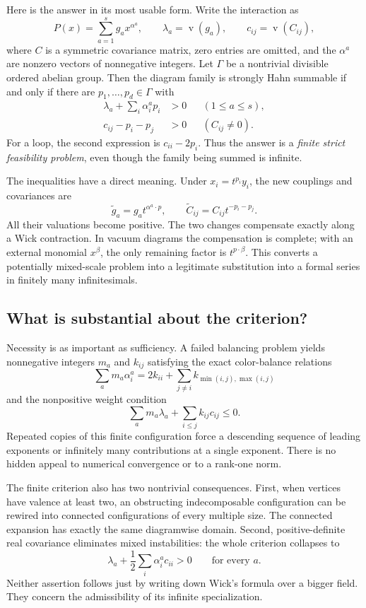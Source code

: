 \documentclass[11pt,letterpaper]{article}
\numberwithin{equation}{section}
\theoremstyle{definition}
\theoremstyle{remark}
\newcommand{\val}{\operatorname v}
\begin{document}
Here is the answer in its most usable form. Write the interaction as
\[
 P(x)=\sum_{a=1}^{s}g_a x^{\alpha^a},\qquad
 \lambda_a=\val(g_a),\qquad c_{ij}=\val(C_{ij}),
\]
where $C$ is a symmetric covariance matrix, zero entries are omitted, and the
$\alpha^a$ are nonzero vectors of nonnegative integers. Let $\Gamma$ be a
nontrivial divisible ordered abelian group. Then the diagram family is
strongly Hahn summable if and only if there are $p_1,\ldots,p_d\in\Gamma$ with
\begin{align}
 \lambda_a+\sum_i\alpha_i^a p_i&>0 &&(1\le a\le s),\label{wick:eq:introvertex}\\
 c_{ij}-p_i-p_j&>0 &&(C_{ij}\ne0).\label{wick:eq:introedge}
\end{align}
For a loop, the second expression is $c_{ii}-2p_i$. Thus the answer is a
\emph{finite strict feasibility problem}, even though the family being
summed is infinite.

The inequalities have a direct meaning. Under $x_i=t^{p_i}y_i$, the new
couplings and covariances are
\[
 \widetilde g_a=g_a t^{\alpha^a\cdot p},\qquad
 \widetilde C_{ij}=C_{ij}t^{-p_i-p_j}.
\]
All their valuations become positive. The two changes compensate exactly
along a Wick contraction. In vacuum diagrams the compensation is complete;
with an external monomial $x^\beta$, the only remaining factor is
$t^{p\cdot\beta}$. This converts a potentially mixed-scale problem into a
legitimate substitution into a formal series in finitely many infinitesimals.

\subsection{What is substantial about the criterion?}

Necessity is as important as sufficiency. A failed balancing problem yields
nonnegative integers $m_a$ and $k_{ij}$ satisfying the exact color-balance
relations
\[
 \sum_a m_a\alpha_i^a=2k_{ii}+\sum_{j\ne i}k_{\min(i,j),\max(i,j)}
\]
and the nonpositive weight condition
\[
 \sum_a m_a\lambda_a+\sum_{i\le j}k_{ij}c_{ij}\le0.
\]
Repeated copies of this finite configuration force a descending sequence of
leading exponents or infinitely many contributions at a single exponent.
There is no hidden appeal to numerical convergence or to a rank-one norm.

The finite criterion also has two nontrivial consequences. First, when
vertices have valence at least two, an obstructing indecomposable configuration
can be rewired into connected configurations of every multiple size. The
connected expansion has exactly the same diagramwise domain. Second,
positive-definite real covariance eliminates mixed instabilities: the whole
criterion collapses to
\[
 \lambda_a+\frac12\sum_i\alpha_i^a c_{ii}>0\qquad\text{for every }a.
\]
Neither assertion follows just by writing down Wick's formula over a bigger
field. They concern the admissibility of its infinite specialization.
\end{document}
